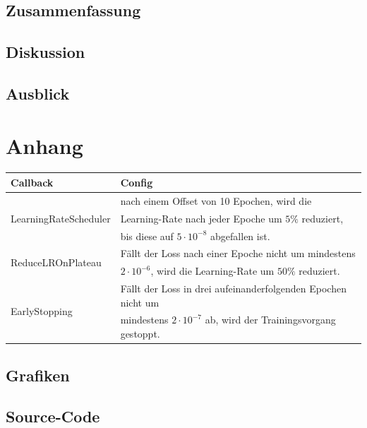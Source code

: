 \section{Zusammenfassung}
\section{Diskussion}
\section{Ausblick}


\appendix
\chapter{Anhang}
\begin{table}
	\centering
	\begin{tabular}{|l|l|}
		\hline
		Callback & Config \\
		\hline
		\multirow{3}{*}{LearningRateScheduler} & nach einem Offset von 10 Epochen, wird die \\
		& Learning-Rate nach jeder Epoche um $5\%$ reduziert, \\
		& bis diese auf $5 \cdot 10^{-8}$ abgefallen ist. \\
		\hline
		\multirow{2}{*}{ReduceLROnPlateau}& Fällt der Loss nach einer Epoche nicht um mindestens\\
		& $2 \cdot 10^{-6}$, wird die Learning-Rate um $50\%$ reduziert.\\
		\hline
		\multirow{2}{*}{EarlyStopping}& Fällt der Loss in drei aufeinanderfolgenden Epochen nicht um  \\ 
		& mindestens $2 \cdot 10^{-7}$ ab, wird der Trainingsvorgang gestoppt.\\
		\hline
	\end{tabular}
	\label{callbacks}
\end{table}
\section{Grafiken}
\section{Source-Code}


%



